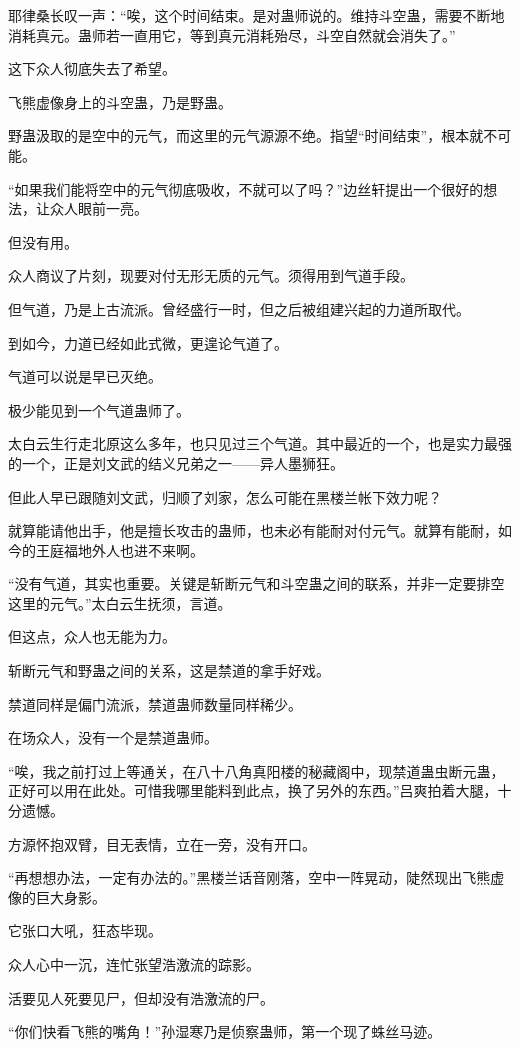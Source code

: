 \begin{this_body}
耶律桑长叹一声：“唉，这个时间结束。是对蛊师说的。维持斗空蛊，需要不断地消耗真元。蛊师若一直用它，等到真元消耗殆尽，斗空自然就会消失了。”

这下众人彻底失去了希望。

飞熊虚像身上的斗空蛊，乃是野蛊。

野蛊汲取的是空中的元气，而这里的元气源源不绝。指望“时间结束”，根本就不可能。

“如果我们能将空中的元气彻底吸收，不就可以了吗？”边丝轩提出一个很好的想法，让众人眼前一亮。

但没有用。

众人商议了片刻，现要对付无形无质的元气。须得用到气道手段。

但气道，乃是上古流派。曾经盛行一时，但之后被组建兴起的力道所取代。

到如今，力道已经如此式微，更遑论气道了。

气道可以说是早已灭绝。

极少能见到一个气道蛊师了。

太白云生行走北原这么多年，也只见过三个气道。其中最近的一个，也是实力最强的一个，正是刘文武的结义兄弟之一——异人墨狮狂。

但此人早已跟随刘文武，归顺了刘家，怎么可能在黑楼兰帐下效力呢？

就算能请他出手，他是擅长攻击的蛊师，也未必有能耐对付元气。就算有能耐，如今的王庭福地外人也进不来啊。

“没有气道，其实也重要。关键是斩断元气和斗空蛊之间的联系，并非一定要排空这里的元气。”太白云生抚须，言道。

但这点，众人也无能为力。

斩断元气和野蛊之间的关系，这是禁道的拿手好戏。

禁道同样是偏门流派，禁道蛊师数量同样稀少。

在场众人，没有一个是禁道蛊师。

“唉，我之前打过上等通关，在八十八角真阳楼的秘藏阁中，现禁道蛊虫断元蛊，正好可以用在此处。可惜我哪里能料到此点，换了另外的东西。”吕爽拍着大腿，十分遗憾。

方源怀抱双臂，目无表情，立在一旁，没有开口。

“再想想办法，一定有办法的。”黑楼兰话音刚落，空中一阵晃动，陡然现出飞熊虚像的巨大身影。

它张口大吼，狂态毕现。

众人心中一沉，连忙张望浩激流的踪影。

活要见人死要见尸，但却没有浩激流的尸。

“你们快看飞熊的嘴角！”孙湿寒乃是侦察蛊师，第一个现了蛛丝马迹。


\end{this_body}

